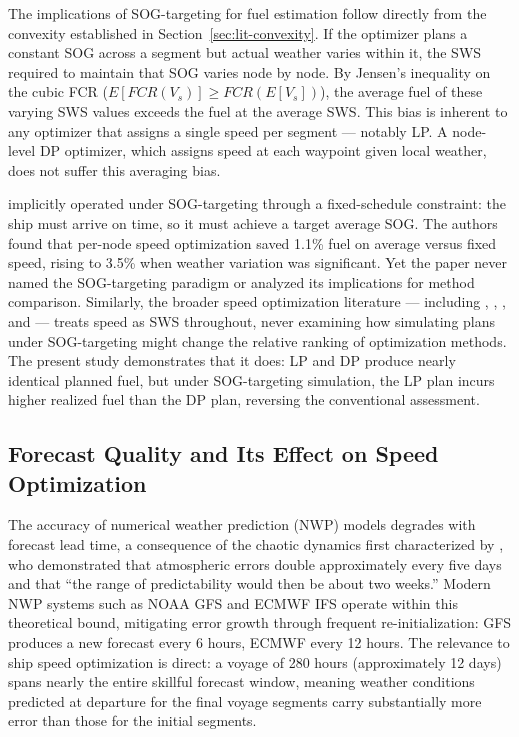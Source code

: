 \documentclass[review]{elsarticle}
\begin{document}
The implications of SOG-targeting for fuel estimation follow directly from the convexity established in Section~\ref{sec:lit-convexity}. If the optimizer plans a constant SOG across a segment but actual weather varies within it, the SWS required to maintain that SOG varies node by node. By Jensen's inequality on the cubic FCR ($E[FCR(V_s)] \geq FCR(E[V_s])$), the average fuel of these varying SWS values exceeds the fuel at the average SWS. This bias is inherent to any optimizer that assigns a single speed per segment --- notably LP. A node-level DP optimizer, which assigns speed at each waypoint given local weather, does not suffer this averaging bias.

\cite{Huotari2021} implicitly operated under SOG-targeting through a fixed-schedule constraint: the ship must arrive on time, so it must achieve a target average SOG. The authors found that per-node speed optimization saved 1.1\% fuel on average versus fixed speed, rising to 3.5\% when weather variation was significant. Yet the paper never named the SOG-targeting paradigm or analyzed its implications for method comparison. Similarly, the broader speed optimization literature --- including \cite{Psaraftis2013}, \cite{Norstad2011}, \cite{Bektas2011}, and \cite{Ronen2011} --- treats speed as SWS throughout, never examining how simulating plans under SOG-targeting might change the relative ranking of optimization methods. The present study demonstrates that it does: LP and DP produce nearly identical planned fuel, but under SOG-targeting simulation, the LP plan incurs higher realized fuel than the DP plan, reversing the conventional assessment.

\subsection{Forecast Quality and Its Effect on Speed Optimization}
\label{sec:lit-forecast}

The accuracy of numerical weather prediction (NWP) models degrades with forecast lead time, a consequence of the chaotic dynamics first characterized by \cite{Lorenz1969}, who demonstrated that atmospheric errors double approximately every five days and that ``the range of predictability would then be about two weeks.'' Modern NWP systems such as NOAA GFS and ECMWF IFS operate within this theoretical bound, mitigating error growth through frequent re-initialization: GFS produces a new forecast every 6 hours, ECMWF every 12 hours. The relevance to ship speed optimization is direct: a voyage of 280 hours (approximately 12 days) spans nearly the entire skillful forecast window, meaning weather conditions predicted at departure for the final voyage segments carry substantially more error than those for the initial segments.
\end{document}
